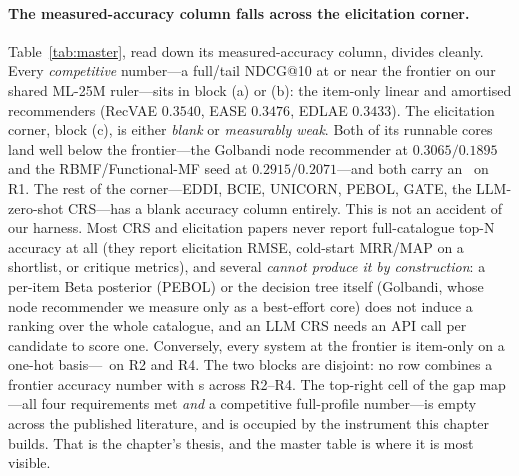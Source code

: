 \documentclass[11pt]{article}
\newcommand{\cmark}{\ding{51}}
\newcommand{\xmark}{\ding{55}}
\begin{document}
\paragraph{The measured-accuracy column falls across the elicitation corner.}
Table~\ref{tab:master}, read down its measured-accuracy column, divides cleanly. Every \emph{competitive} number---a full/tail
NDCG@10 at or near the frontier on our shared ML-25M ruler---sits in block (a) or (b): the item-only linear and
amortised recommenders (RecVAE $0.3540$, EASE $0.3476$, EDLAE $0.3433$). The elicitation corner, block (c), is either
\emph{blank} or \emph{measurably weak}. Both of its runnable cores land well below the frontier---the Golbandi node
recommender at $0.3065/0.1895$ and the RBMF/Functional-MF seed at $0.2915/0.2071$---and both carry an \xmark\ on R1.
The rest of the corner---EDDI, BCIE, UNICORN, PEBOL, GATE, the LLM-zero-shot CRS---has a blank accuracy column
entirely. This is not an accident of our harness. Most CRS and elicitation papers never report full-catalogue
top-N accuracy at all (they report elicitation RMSE, cold-start MRR/MAP on a shortlist, or critique metrics), and
several \emph{cannot produce it by construction}: a per-item Beta posterior (PEBOL) or the decision tree itself
(Golbandi, whose node recommender we measure only as a best-effort core) does not induce a ranking over the whole
catalogue, and an LLM CRS needs an API call per candidate to score one. Conversely, every system at the frontier is
item-only on a one-hot basis---\xmark\ on R2 and R4. The two blocks are disjoint: no row combines a frontier
accuracy number with \cmark s across R2--R4. The top-right cell of the
gap map---all four requirements met \emph{and} a competitive full-profile number---is empty across the published
literature, and is occupied by the instrument this chapter builds. That is the chapter's thesis, and the master
table is where it is most visible.
\end{document}
